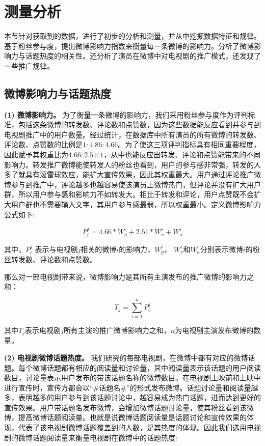 \section{测量分析}

本节针对获取到的数据，进行了初步的分析和测量，并从中挖掘数据特征和规律。基于粉丝参与度，提出微博影响力指数来衡量每一条微博的影响力。分析了微博影响力与话题热度的相关性。还分析了演员在微博中对电视剧的推广模式，还发现了一些推广规律。

\subsection{微博影响力与话题热度}

\textbf{(1) 微博影响力。}
为了衡量一条微博的影响力，我们采用粉丝参与度作为评判标准，包括这条微博的转发数、评论数和点赞数，因为这些数据能反应看到并参与到电视剧推广中的用户数量。经过统计，在数据库中所有演员的所有微博的转发数、评论数、点赞数的比例是${1: 1.86: 4.66}$。为了使这三项评判指标具有相同重要程度，因此赋予其权重比为${4.66: 2.51: 1}$，从中也能反应出转发、评论和点赞能带来的不同影响力。转发推广微博能使转发人的粉丝也看到，用户的参与感非常强，转发的人多了就具有滚雪球效应，能扩大宣传效果，因此其权重最大。用户通过评论推广微博参与到推广中，评论越多也越容易使该演员上微博热门，但评论并没有扩大用户群，所以用户参与感和影响力不如转发大。相比于转发和评论，用户点赞既不会扩大用户群也不需要输入文字，其用户参与感最弱，所以权重最小。定义微博影响力公式如下:

\begin{equation}P_i^j = 4.66 * W_p^i + 2.51 * W_v^i + W_a^i\end{equation}

其中，$P_i^j$ 表示与电视剧$j$相关的微博$i$的影响力，$W_p^i$， $W_v^i$和$W_a^i$分别表示微博$i$的粉丝转发数、评论数和点赞数。

那么对一部电视剧带来说，微博影响力是其所有主演发布的推广微博的影响力之和：

\begin{equation}T_j = \sum_{i=1}^n P_i^j\end{equation}

其中$T_j$表示电视剧$j$所有主演的推广微博影响力之和，$n$为电视剧主演发布微博的数量。

\textbf{(2) 电视剧微博话题热度。}
我们研究的每部电视剧，在微博中都有对应的微博话题。每个微博话题都有相应的阅读量和讨论量，其中阅读量表示该话题的用户阅读数目，讨论量表示用户发布的带该话题名称的微博数目。在电视剧上映前和上映中进行宣传时，宣传方都会以“\#话题名\#”的形式发布微博。话题讨论量和阅读量越多，表明越多的用户参与到该话题讨论中，越容易成为热门话题，进而达到更好的宣传效果。用户带话题名发布微博，会增加微博话题讨论量，使其粉丝看到该微博，提高微博话题阅读量。也就是说微博话题阅读量是话题讨论和宣传效果的体现，代表了该电视剧微博话题覆盖到的人数，是其热度的体现。因此我们选用电视剧的微博话题阅读量来衡量电视剧在微博中的话题热度:


